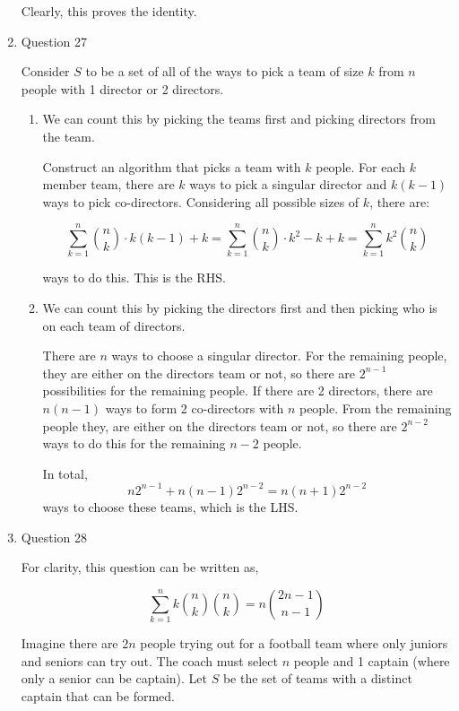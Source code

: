 \documentclass[12pt]{exam}
\begin{document}
\begin{enumerate}
    Clearly, this proves the identity. 
    
    \item Question 27
    
    Consider $S$ to be a set of all of the ways to pick a team of size $k$ from $n$ people with 1 director or 2 directors. 
    
    \begin{enumerate}
        \item We can count this by picking the teams first and picking directors from the team. 
        
        Construct an algorithm that picks a team with $k$ people. For each $k$ member team, there are $k$ ways to pick a singular director and $k(k-1)$ ways to pick co-directors. Considering all possible sizes of $k$, there are:
        
        $$\sum_{k = 1}^{n} \binom{n}{k} \cdot k(k -1) +k = \sum_{k = 1}^n \binom{n}{k}\cdot k^2 -k + k = \sum_{k =1}^n k^2\binom{n}{k}$$
        
        ways to do this. This is the RHS.
        
        \item We can count this by picking the directors first and then picking who is on each team of directors.
        
        There are $n$ ways to choose a singular director. For the remaining people, they are either on the directors team or not, so there are $2^{n - 1}$ possibilities for the remaining people. If there are 2 directors, there are $n(n - 1)$ ways to form 2 co-directors with $n$ people. From the remaining people they, are either on the directors team or not, so there are $2^{n - 2}$ ways to do this for the remaining $n - 2$ people.
        
        In total, $$n2^{n - 1} + n(n -1)2^{n - 2} = n(n + 1)2^{n -2}$$ ways to choose these teams, which is the LHS.
        
    \end{enumerate}
    
    \item Question 28
    
    For clarity, this question can be written as,
    
    $$\sum_{k = 1}^{n} k \binom{n}{k} \binom{n}{k} = n \binom{2n - 1}{n - 1}$$
    
    Imagine there are $2n$ people trying out for a football team where only juniors and seniors can try out. The coach must select $n$ people and 1 captain (where only a senior can be captain). Let $S$ be the set of teams with a distinct captain that can be formed. 
    

\end{enumerate}
\end{document}
